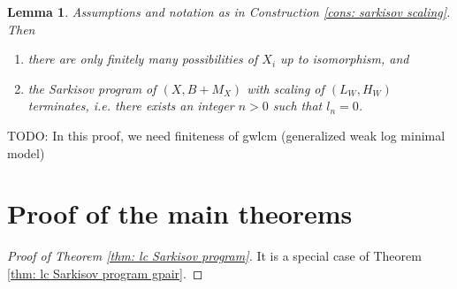 \documentclass[11pt]{amsart}
\numberwithin{equation}{section}
\newtheorem{lem}[thm]{Lemma}
\theoremstyle{definition}
\theoremstyle{definition}
\theoremstyle{definition}
\begin{document}
\begin{lem}\label{lem: sarkisov scaling terminate}
Assumptions and notation as in Construction \ref{cons: sarkisov scaling}. Then
\begin{enumerate}
    \item there are only finitely many possibilities of $X_i$ up to isomorphism, and
    \item the Sarkisov program of $(X,B+M_X)$ with scaling of $(L_W,H_W)$ terminates, i.e. there exists an integer $n>0$ such that $l_n=0$.
\end{enumerate}
\end{lem}
TODO:  In this proof, we need finiteness of gwlcm  (generalized weak log minimal model)


\section{Proof of the main theorems}

\begin{proof}[Proof of Theorem \ref{thm: lc Sarkisov program}]
    It is a special case of Theorem \ref{thm: lc Sarkisov program gpair}.
\end{proof}
\end{document}

